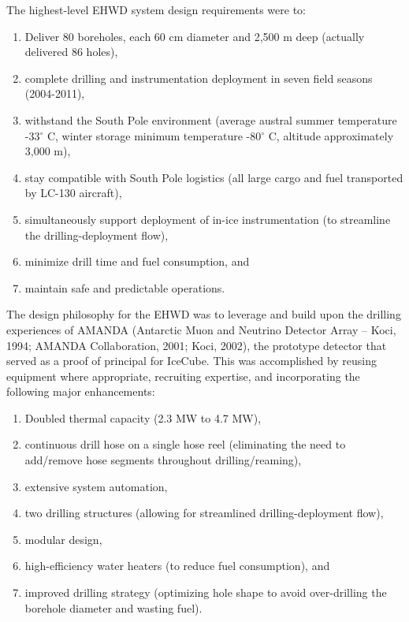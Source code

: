 The highest-level EHWD system design requirements were to:

\begin{enumerate}
\item	Deliver 80 boreholes, each 60 cm diameter and 2,500 m deep (actually delivered 86 holes),
\item	complete drilling and instrumentation deployment in seven field seasons (2004-2011),
\item	withstand the South Pole environment (average austral summer temperature -33$^{\circ}$ C, winter storage minimum temperature -80$^{\circ}$ C, altitude approximately 3,000 m),
\item	stay compatible with South Pole logistics (all large cargo and fuel transported by LC-130 aircraft),
\item	simultaneously support deployment of in-ice instrumentation (to streamline the drilling-deployment flow),
\item	minimize drill time and fuel consumption, and
\item	maintain safe and predictable operations.
\end{enumerate}

The design philosophy for the EHWD was to leverage and build upon the drilling experiences of AMANDA (Antarctic Muon and Neutrino Detector Array – Koci, 1994; AMANDA Collaboration, 2001; Koci, 2002), the prototype detector that served as a proof of principal for IceCube.  This was accomplished by reusing equipment where appropriate, recruiting expertise, and incorporating the following major enhancements:

\begin{enumerate}
\item	Doubled thermal capacity (2.3 MW to 4.7 MW),
\item	continuous drill hose on a single hose reel (eliminating the need to add/remove hose segments throughout drilling/reaming),
\item	extensive system automation,
\item	two drilling structures (allowing for streamlined drilling-deployment flow),
\item	modular design,
\item	high-efficiency water heaters (to reduce fuel consumption), and
\item	improved drilling strategy (optimizing hole shape to avoid over-drilling the borehole diameter and wasting fuel).
\end{enumerate}


